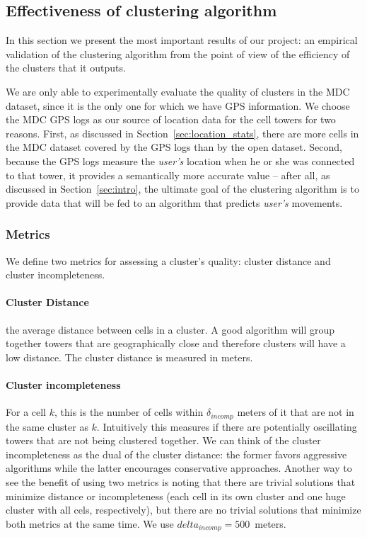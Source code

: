 \documentclass[letterpaper, 12pt, conference]{ieeeconf}
\begin{document}
\subsection{Effectiveness of clustering algorithm}
\label{sec:effectiveness}
In this section we present the most important results of our project: an 
empirical validation of the clustering algorithm from the point of view of 
the efficiency of the clusters that it outputs.

We are only able to experimentally evaluate the quality of clusters in the 
MDC dataset, since it is the only one for which we have GPS information. We 
choose the MDC GPS logs as our source of location data for the cell towers 
for two reasons. First, as discussed in Section~\ref{sec:location_stats}, 
there are more cells in the MDC dataset covered by the GPS logs than by the 
open dataset. Second, because the GPS logs measure the \textit{user's} 
location when he or she was connected to that tower, it provides a 
semantically more accurate value -- after all, as discussed in
Section~\ref{sec:intro}, the ultimate goal of the clustering algorithm is to provide data 
that will be fed to an algorithm that predicts \textit{user's} movements.
\subsubsection{Metrics}



We define two metrics for assessing a cluster's quality: cluster distance and 
cluster incompleteness.

\paragraph{Cluster Distance} the average distance between cells in a cluster. 
A good algorithm will group together towers that are geographically close and 
therefore clusters will have a low distance. The cluster distance is measured 
in meters.

\paragraph{Cluster incompleteness} For a cell $k$, this is the number of 
cells within $\delta_{incomp}$ meters of it that are not in the same cluster 
as $k$. Intuitively this measures if there are potentially oscillating towers 
that are not being clustered together. We can think of the cluster 
incompleteness as the dual of the cluster distance: the former favors 
aggressive algorithms while the latter encourages conservative approaches. 
Another way to see the benefit of using two metrics is noting that there are 
trivial solutions that minimize distance or incompleteness (each cell in its 
own cluster and one huge cluster with all cels, respectively), but there are 
no trivial solutions that minimize both metrics at the same time. We use
$delta_{incomp} = 500$~meters.
\end{document}
